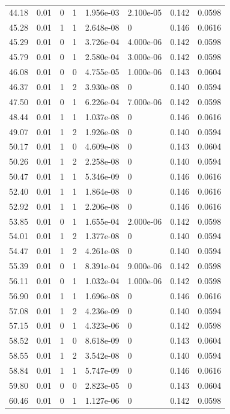 \documentclass[preview]{standalone}
\begin{document}
{{{\begin{tabular}{L{1.2cm}C{1.2cm} C{0.3cm}C{0.5cm} C{1.4cm}C{1.4cm} C{1.4cm}C{1.4cm}}
  44.18  &  0.01  & 0     &  1 &  1.956e-03  & 2.100e-05  & 0.142 &  0.0598   \\ 
  45.28  &  0.01  & 1     &  1 &  2.648e-08  & 0  & 0.146 &  0.0616   \\ 
  45.29  &  0.01  & 0     &  1 &  3.726e-04  & 4.000e-06  & 0.142 &  0.0598   \\ 
  45.79  &  0.01  & 0     &  1 &  2.580e-04  & 3.000e-06  & 0.142 &  0.0598   \\ 
  46.08  &  0.01  & 0     &  0 &  4.755e-05  & 1.000e-06  & 0.143 &  0.0604   \\ 
  46.37  &  0.01  & 1     &  2 &  3.930e-08  & 0  & 0.140 &  0.0594   \\ 
  47.50  &  0.01  & 0     &  1 &  6.226e-04  & 7.000e-06  & 0.142 &  0.0598   \\ 
  48.44  &  0.01  & 1     &  1 &  1.037e-08  & 0  & 0.146 &  0.0616   \\ 
  49.07  &  0.01  & 1     &  2 &  1.926e-08  & 0  & 0.140 &  0.0594   \\ 
  50.17  &  0.01  & 1     &  0 &  4.609e-08  & 0  & 0.143 &  0.0604   \\ 
  50.26  &  0.01  & 1     &  2 &  2.258e-08  & 0  & 0.140 &  0.0594   \\ 
  50.47  &  0.01  & 1     &  1 &  5.346e-09  & 0  & 0.146 &  0.0616   \\ 
  52.40  &  0.01  & 1     &  1 &  1.864e-08  & 0  & 0.146 &  0.0616   \\ 
  52.92  &  0.01  & 1     &  1 &  2.206e-08  & 0  & 0.146 &  0.0616   \\ 
  53.85  &  0.01  & 0     &  1 &  1.655e-04  & 2.000e-06  & 0.142 &  0.0598   \\ 
  54.01  &  0.01  & 1     &  2 &  1.377e-08  & 0  & 0.140 &  0.0594   \\ 
  54.47  &  0.01  & 1     &  2 &  4.261e-08  & 0  & 0.140 &  0.0594   \\ 
  55.39  &  0.01  & 0     &  1 &  8.391e-04  & 9.000e-06  & 0.142 &  0.0598   \\ 
  56.11  &  0.01  & 0     &  1 &  1.032e-04  & 1.000e-06  & 0.142 &  0.0598   \\ 
  56.90  &  0.01  & 1     &  1 &  1.696e-08  & 0  & 0.146 &  0.0616   \\ 
  57.08  &  0.01  & 1     &  2 &  4.236e-09  & 0  & 0.140 &  0.0594   \\ 
  57.15  &  0.01  & 0     &  1 &  4.323e-06  & 0  & 0.142 &  0.0598   \\ 
  58.52  &  0.01  & 1     &  0 &  8.618e-09  & 0  & 0.143 &  0.0604   \\ 
  58.55  &  0.01  & 1     &  2 &  3.542e-08  & 0  & 0.140 &  0.0594   \\ 
  58.84  &  0.01  & 1     &  1 &  5.747e-09  & 0  & 0.146 &  0.0616   \\ 
  59.80  &  0.01  & 0     &  0 &  2.823e-05  & 0  & 0.143 &  0.0604   \\ 
  60.46  &  0.01  & 0     &  1 &  1.127e-06  & 0  & 0.142 &  0.0598   \\ 
\hline 
\end{tabular} 

}}}
\end{document}
